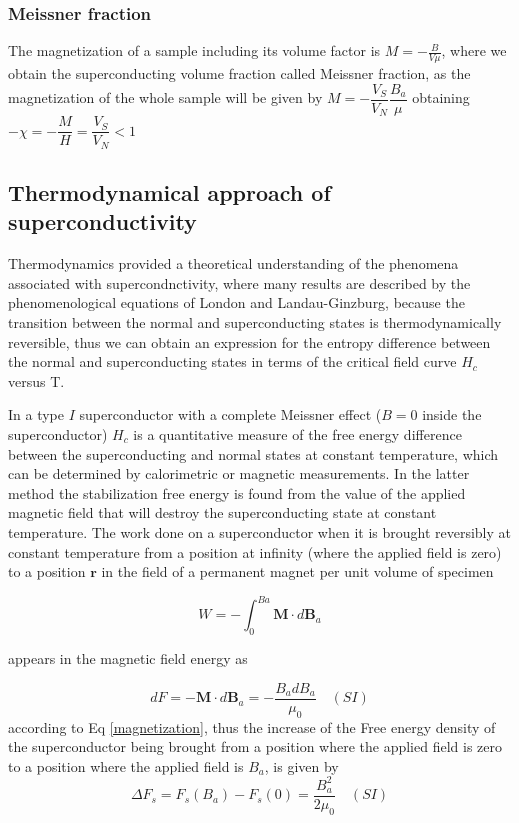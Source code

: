 \documentclass[openany,11pt,a4paper]{report}
\begin{document}
 
 \subsubsection{ Meissner fraction}

 The magnetization of a sample including its volume factor is $M=-\frac{B}{V \mu}$, where we obtain the superconducting volume fraction called Meissner fraction, as the magnetization of the whole sample will be given by $M=-\dfrac{V_{S}}{V_{N}} \dfrac{B_{a}}{\mu}$ obtaining $- \chi =- \dfrac{M}{H}=\dfrac{V_{S}}{V_{N}} <1$
 


\subsection{Thermodynamical approach of superconductivity}


Thermodynamics provided a theoretical understanding of the phenomena associated with supercondnctivity, where many results are described by the phenomenological
equations of London and Landau-Ginzburg, because the transition between the normal and superconducting states is thermodynamically
reversible, thus we can obtain an expression for the entropy difference between the
normal and superconducting states in terms of the critical field curve $H_{c}$ versus T.


In a type $I$ superconductor with a complete Meissner effect ($B=0$ inside the superconductor) $H_{c}$ is a quantitative
measure of the free energy difference between the superconducting and
normal states at constant temperature, which can be determined by calorimetric or magnetic measurements.
In the latter method the stabilization free energy is found from the
value of the applied magnetic field that will destroy the superconducting
state at constant temperature. 
The work done on a superconductor when it is brought reversibly at constant temperature from a position at infinity (where the applied field is zero) to a position
$\textbf{r}$ in the field of a permanent magnet per unit volume of specimen

\begin{equation}
W= -\int _{0}^{Ba} \textbf{M} \cdot d \textbf{B}_{a}
\end{equation}

appears in the magnetic field energy as

\begin{equation*}
dF= - \textbf{M} \cdot d\textbf{B}_{a} =  -\dfrac{ B_{a} dB_{a}}{\mu_{0}} \quad (SI)
\end{equation*}
according to Eq \ref{magnetization}, thus the increase of the Free energy density of the superconductor being brought from a position where the applied field is zero to a position
where the applied field is $B_{a}$, is given by 
\begin{equation}
\Delta F_{s} =F_{s}(B_{a})-F_{s}(0)= \dfrac{B_{a}^{2}}{2\mu_{0}} \quad (SI)
\end{equation}
\end{document}
